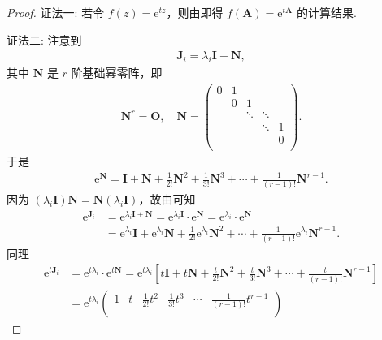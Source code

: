\documentclass[../../main.tex]{subfiles}%
\begin{document}
\begin{proof}

{\color{blue}证法一:}
若令 $f(z)=\mathrm{e}^{tz}$，则由即得 $f(\boldsymbol{A}) = \mathrm{e}^{t\boldsymbol{A}}$ 的计算结果. 

{\color{blue}证法二:}
注意到
\begin{align*}
\boldsymbol{J}_i=\lambda_i\boldsymbol{I}+\boldsymbol{N},
\end{align*}
其中 $\boldsymbol{N}$ 是 $r$ 阶基础幂零阵，即
\begin{align*}
\boldsymbol{N}^r=\boldsymbol{O},\quad \boldsymbol{N}=\left( \begin{matrix}
0&		1&		&		&		\\
&		0&		1&		&		\\
&		&		\ddots&		\ddots&		\\
&		&		&		\ddots&		1\\
&		&		&		&		0\\
\end{matrix} \right) .
\end{align*}
于是
\begin{align*}
\mathrm{e}^{\boldsymbol{N}}=\boldsymbol{I}+\boldsymbol{N}+\frac{1}{2!}\boldsymbol{N}^2+\frac{1}{3!}\boldsymbol{N}^3+\cdots+\frac{1}{(r - 1)!}\boldsymbol{N}^{r - 1}.
\end{align*}
因为 $(\lambda_i\boldsymbol{I})\boldsymbol{N}=\boldsymbol{N}(\lambda_i\boldsymbol{I})$，故由可知
\begin{align*}
\mathrm{e}^{\boldsymbol{J}_i}&=\mathrm{e}^{\lambda_i\boldsymbol{I}+\boldsymbol{N}}=\mathrm{e}^{\lambda_i\boldsymbol{I}}\cdot\mathrm{e}^{\boldsymbol{N}}=\mathrm{e}^{\lambda_i}\cdot\mathrm{e}^{\boldsymbol{N}}\\
&=\mathrm{e}^{\lambda_i}\boldsymbol{I}+\mathrm{e}^{\lambda_i}\boldsymbol{N}+\frac{1}{2!}\mathrm{e}^{\lambda_i}\boldsymbol{N}^2+\cdots+\frac{1}{(r - 1)!}\mathrm{e}^{\lambda_i}\boldsymbol{N}^{r - 1}.
\end{align*}
同理
\begin{align*}
\mathrm{e}^{t\boldsymbol{J}_i}&=\mathrm{e}^{t\lambda_i}\cdot\mathrm{e}^{t\boldsymbol{N}}=\mathrm{e}^{t\lambda _i}\left[ t\boldsymbol{I}+t\boldsymbol{N}+\frac{t}{2!}\boldsymbol{N}^2+\frac{t}{3!}\boldsymbol{N}^3+\cdots +\frac{t}{(r-1)!}\boldsymbol{N}^{r-1} \right] 
\\
&=\mathrm{e}^{t\lambda_i}
\begin{pmatrix}
1 & t & \frac{1}{2!}t^2 & \frac{1}{3!}t^3 & \cdots & \frac{1}{(r - 1)!}t^{r - 1} \\

\end{pmatrix}
\end{align*}
\end{proof}
\end{document}
